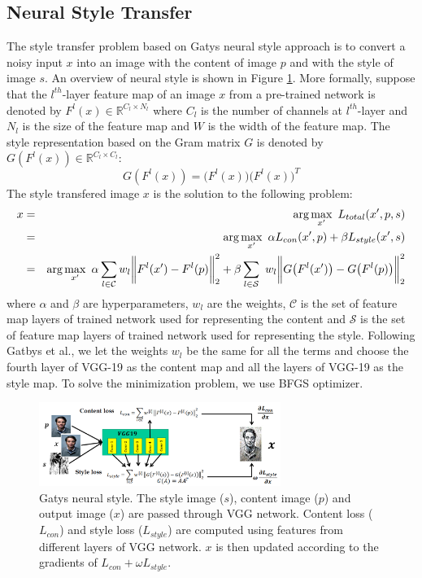 \documentclass{article}
\begin{document}
\subsection{Neural Style Transfer}
The style transfer problem based on Gatys neural style approach \cite{Gatys} is to convert a noisy input $x$ into an image with the content of image $p$ and with the style of image $s$. An overview of neural style is shown in Figure \ref{fig:neuralstyle}. More formally, suppose that the $l^{th}$-layer feature map of an image $x$ from a pre-trained network is denoted by $F^{l}(x) \in \mathbb{R}^{C_l\times N_l}$ where $C_l$ is the number of channels at $l^{th}$-layer and $N_l$ is the size of the feature map and $W$ is the width of the feature map. The style representation based on the Gram matrix $G$ is denoted by $G(F^{l}(x)) \in \mathbb{R}^{C_l\times C_l}$:
\begin{equation}
  G(F^{l}(x)) = \bigg(F^{l}(x)\bigg)\bigg(F^{l}(x)\bigg)^T
\end{equation}
The style transfered image $x$ is the solution to the following problem:
\begin{eqnarray}
  x &=& \textnormal{arg} \max\limits_{x'}\ L_{total}(x',p,s)\\
    &=& \textnormal{arg} \max\limits_{x'}\ \alpha L_{con}(x',p) + \beta L_{style}(x',s)\\
    &=& \textnormal{arg} \max\limits_{x'}\ \alpha \sum_{l\in \mathcal{C}} w_l\bigg\|F^{l}(x')-F^{l}(p)\bigg\|^2_2
    + \beta \sum_{l\in \mathcal{S}}\ w_l\bigg\|G\big(F^{l}(x')\big)-G\big(F^{l}(p)\big)\bigg\|^2_2
\end{eqnarray}
where $\alpha$ and $\beta$ are hyperparameters, $w_l$ are the weights, $\mathcal{C}$ is the set of feature map layers of trained network used for representing the content and $\mathcal{S}$ is the set of feature map layers of trained network used for representing the style. Following Gatbys et al., we let the weights $w_l$ be the same for all the terms and choose the fourth layer of VGG-19 as the content map and all the layers of VGG-19 as the style map. To solve the minimization problem, we use BFGS optimizer.

\begin{figure}[t]
  \centering
  \includegraphics[width=0.7\textwidth]{figure/neuralstyle.png}
  \caption{Gatys neural style. The style image ($s$), content image ($p$) and output image ($x$) are passed through VGG network. Content loss ($L_{con}$) and style loss ($L_{style}$) are computed using features from different layers of VGG network. $x$ is then updated according to the gradients of $L_{con} + \omega L_{style}$.}
  \label{fig:neuralstyle}
\end{figure}
\end{document}
